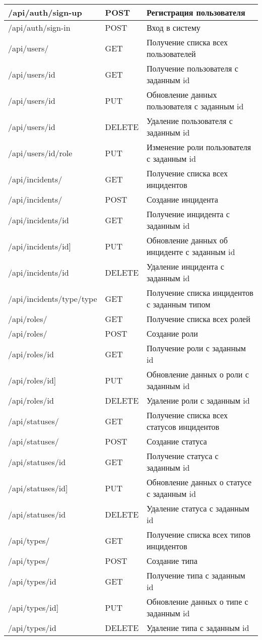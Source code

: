 \begin{longtable}{|p{}|p{}|p{}|}
    /api/auth/sign-up & POST & Регистрация пользователя \\\hline
    /api/auth/sign-in & POST & Вход в систему \\\hline
    /api/users/ & GET & Получение списка всех пользователей \\\hline
    /api/users/{id} & GET & Получение пользователя с заданным id \\\hline
    /api/users/{id} & PUT & Обновление данных пользователя с заданным id \\\hline
    /api/users/{id} & DELETE & Удаление пользователя с заданным id \\\hline
    /api/users/{id}/role & PUT & Изменение роли пользователя с заданным id \\\hline
    /api/incidents/ & GET & Получение списка всех инцидентов \\\hline
    /api/incidents/ & POST & Создание инцидента \\\hline
    /api/incidents/{id} & GET & Получение инцидента с заданным id \\\hline
    /api/incidents/{id}] & PUT & Обновление данных об инциденте с заданным id \\\hline
    /api/incidents/{id} & DELETE & Удаление инцидента с заданным id \\\hline
    /api/incidents/type/{type} & GET & Получение списка инцидентов с заданным типом \\\hline
    /api/roles/ & GET & Получение списка всех ролей \\\hline
    /api/roles/ & POST & Создание роли \\\hline
    /api/roles/{id} & GET & Получение роли с заданным id \\\hline
    /api/roles/{id}] & PUT & Обновление данных о роли с заданным id \\\hline
    /api/roles/{id} & DELETE & Удаление роли с заданным id \\\hline
    /api/statuses/ & GET & Получение списка всех статусов инцидентов \\\hline
    /api/statuses/ & POST & Создание статуса \\\hline
    /api/statuses/{id} & GET & Получение статуса с заданным id \\\hline
    /api/statuses/{id}] & PUT & Обновление данных о статусе с заданным id \\\hline
    /api/statuses/{id} & DELETE & Удаление статуса с заданным id \\\hline
    /api/types/ & GET & Получение списка всех типов инцидентов \\\hline
    /api/types/ & POST & Создание типа \\\hline
    /api/types/{id} & GET & Получение типа с заданным id \\\hline
    /api/types/{id}] & PUT & Обновление данных о типе с заданным id \\\hline
    /api/types/{id} & DELETE & Удаление типа с заданным id \\\hline   
\end{longtable}

